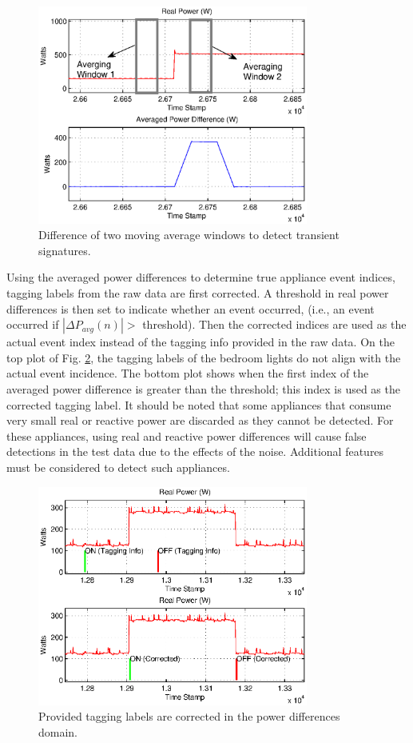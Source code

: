 \documentclass[conference]{IEEEtran}
\begin{document}
\begin{figure}[!t]
	\centering
	\includegraphics[width=3.5in]{fig/maw.eps}
	\caption{Difference of two moving average windows to detect transient signatures.}
	\label{fig:maw}
\end{figure}

Using the averaged power differences to determine true appliance event indices, tagging labels from the raw data are first corrected.  A threshold in real power differences is then set to indicate whether an event occurred, (i.e., an event occurred if $|\Delta P_{avg}(n)| >$ threshold).  Then the corrected indices are used as the actual event index instead of the tagging info provided in the raw data.  On the top plot of Fig. \ref{fig:tagging}, the tagging labels of the bedroom lights do not align with the actual event incidence.  The bottom plot shows when the first index of the averaged power difference is greater than the threshold; this index is used as the corrected tagging label.  It should be noted that some appliances that consume very small real or reactive power are discarded as they cannot be detected.  For these appliances, using real and reactive power differences will cause false detections in the test data due to the effects of the noise.  Additional features must be considered to detect such appliances.

\begin{figure}[!t]
	\centering
	\includegraphics[width=3.5in]{fig/tagginginfo.eps}
	\caption{Provided tagging labels are corrected in the power differences domain.}
	\label{fig:tagging}
\end{figure}
	
\end{document}
